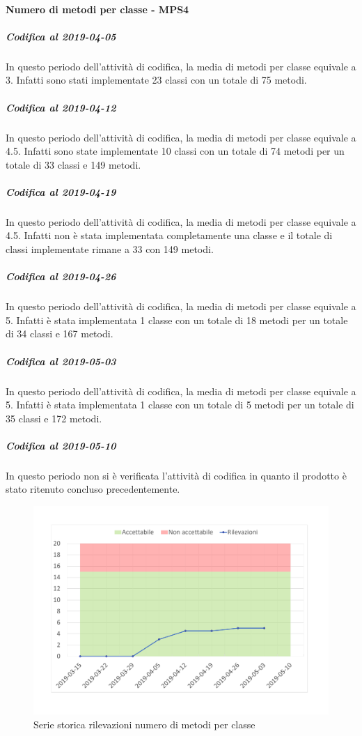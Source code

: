 \paragraph{Numero di metodi per classe - MPS4}
\subparagraph{Codifica al 2019-04-05}
In questo periodo dell'attività di codifica, la media di metodi per classe equivale a 3. Infatti sono stati implementate 23 classi con un totale di 75 metodi.

\subparagraph{Codifica al 2019-04-12}
In questo periodo dell'attività di codifica, la media di metodi per classe equivale a 4.5. Infatti sono state implementate 10 classi con un totale di 74 metodi per un totale di 33 classi e 149 metodi.

\subparagraph{Codifica al 2019-04-19}
In questo periodo dell'attività di codifica, la media di metodi per classe equivale a 4.5. Infatti non è stata implementata completamente una classe e il totale di classi implementate rimane a 33 con 149 metodi.

\subparagraph{Codifica al 2019-04-26}
In questo periodo dell'attività di codifica, la media di metodi per classe equivale a 5. Infatti è stata implementata 1 classe con un totale di 18 metodi per un totale di 34 classi e 167 metodi.

\subparagraph{Codifica al 2019-05-03}
In questo periodo dell'attività di codifica, la media di metodi per classe equivale a 5. Infatti è stata implementata 1 classe con un totale di 5 metodi per un totale di 35 classi e 172 metodi.

\subparagraph{Codifica al 2019-05-10}
In questo periodo non si è verificata l'attività di codifica in quanto il prodotto è stato ritenuto concluso precedentemente.

\begin{figure}[H]
	\centering
	\includegraphics[scale=0.6]{images/resoconto/MPS4Chart.pdf}
	\caption{Serie storica rilevazioni numero di metodi per classe}	
\end{figure}

